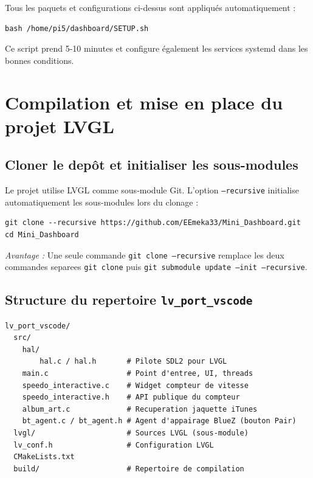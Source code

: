 \documentclass[a4paper,11pt]{article}
\begin{document}
Tous les paquets et configurations ci-dessus sont appliqués automatiquement :

\begin{lstlisting}[style=bashcode]
bash /home/pi5/dashboard/SETUP.sh
\end{lstlisting}

Ce script prend 5-10 minutes et configure également les services systemd dans les bonnes conditions.

\section{Compilation et mise en place du projet LVGL}

\subsection{Cloner le depôt et initialiser les sous-modules}

Le projet utilise LVGL comme sous-module Git. L'option \texttt{--recursive} initialise
automatiquement les sous-modules lors du clonage :

\begin{lstlisting}[style=bashcode]
git clone --recursive https://github.com/EEmeka33/Mini_Dashboard.git
cd Mini_Dashboard
\end{lstlisting}

\emph{Avantage :} Une seule commande \texttt{git clone --recursive} remplace les deux
commandes separees \texttt{git clone} puis \texttt{git submodule update --init --recursive}.

\newpage

\subsection{Structure du repertoire \texttt{lv\_port\_vscode}}

\begin{verbatim}
lv_port_vscode/
  src/
    hal/
        hal.c / hal.h       # Pilote SDL2 pour LVGL
    main.c                  # Point d'entree, UI, threads
    speedo_interactive.c    # Widget compteur de vitesse
    speedo_interactive.h    # API publique du compteur
    album_art.c             # Recuperation jaquette iTunes
    bt_agent.c / bt_agent.h # Agent d'appairage BlueZ (bouton Pair)
  lvgl/                     # Sources LVGL (sous-module)
  lv_conf.h                 # Configuration LVGL
  CMakeLists.txt
  build/                    # Repertoire de compilation
\end{verbatim}
\end{document}
